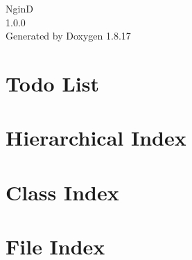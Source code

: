 \let\mypdfximage\pdfximage\def\pdfximage{\immediate\mypdfximage}\documentclass[twoside]{book}
\newcommand{\+}{\discretionary{\mbox{\scriptsize$\hookleftarrow$}}{}{}}
\newcommand{\clearemptydoublepage}{%
  \newpage{\pagestyle{empty}\cleardoublepage}%
}
\begin{document}
\hypersetup{pageanchor=false,
             bookmarksnumbered=true,
             pdfencoding=unicode
            }
\begin{titlepage}
\vspace*{7cm}
\begin{center}%
{\Large NginD \\[1ex]\large 1.\+0.\+0 }\\
\vspace*{1cm}
{\large Generated by Doxygen 1.8.17}\\
\end{center}
\end{titlepage}
\clearemptydoublepage
{}
\tableofcontents
\clearemptydoublepage
{}
\hypersetup{pageanchor=true}

\chapter{Todo List}
\label{todo}

\chapter{Hierarchical Index}

\chapter{Class Index}

\chapter{File Index}

\end{document}

